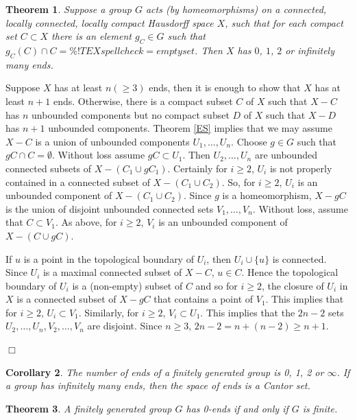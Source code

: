 \documentclass[12pt]{article}
\newtheorem{theorem}{Theorem}[subsection]
\newtheorem{corollary}[theorem]{Corollary}
\newenvironment{proof}{\addvspace{12pt}\noindent{\bf Proof:}}{
$\Box$\par\addvspace{12pt}}
\begin{document}
\begin{theorem}\label{E3inf} 
Suppose a group $G$ acts (by homeomorphisms) on a connected, locally connected, locally compact Hausdorff space $X$, such that for each compact set $C\subset X$ there is an element $g_C\in G$ such that $g_C(C)\cap C=\% !TEX spellcheck = emptyset$. Then $X$ has $0$, $1$, $2$ or infinitely many ends.
\end{theorem}

\begin{proof}
Suppose $X$ has at least $n(\geq 3)$ ends, then it is enough to show that $X$ has at least $n+1$ ends. Otherwise, there is a compact subset $C$ of $X$ such that $X-C$ has $n$ unbounded components but no compact subset $D$ of $X$ such that $X-D$ has $n+1$ unbounded components. Theorem \ref{ES} implies that we may assume $X-C$ is a union of unbounded components $U_1,\ldots, U_n$. Choose $g\in G$ such that $gC\cap C=\emptyset$. Without loss assume $gC\subset U_1$. Then $U_2,\ldots, U_n$ are unbounded connected subsets of $X-(C_1\cup gC_1)$. Certainly for $i\geq 2$, $U_i$ is not properly contained in a connected subset of $X-(C_1\cup C_2)$. So, for $i\geq 2$, $U_i$ is an unbounded component of $X-(C_1\cup C_2)$. Since $g$ is a homeomorphism, $X-gC$ is the union of disjoint unbounded connected sets $V_1,\ldots, V_n$. Without loss, assume that $C\subset V_1$. As above, for $i\geq 2$, $V_i$ is an unbounded component of $X-(C\cup gC)$. 

If $u$ is a point in the topological boundary of $U_i$, then $U_i\cup\{u\}$ is connected. Since $U_i$ is a maximal connected subset of $X-C$, $u\in C$. Hence the topological boundary of $U_i$ is a (non-empty) subset of $C$ and so for $i\geq 2$, the closure of $U_i$ in $X$ is a connected subset of $X-gC$ that contains a point of $V_1$. This implies that for $i\geq 2$, $U_i\subset V_1$. Similarly, for $i\geq 2$, $V_i\subset U_1$. This implies that the $2n-2$ sets $U_2,\ldots, U_n, V_2,\ldots, V_n$ are disjoint. Since $n\geq 3$, $2n-2=n+(n-2)\geq n+1$.
\end{proof}

\begin{corollary}
The number of ends of a finitely generated group is 0, 1, 2 or $\infty$. If a group has infinitely many ends, then the space of ends is a Cantor set.
\end{corollary}





\begin{theorem}
A finitely generated group $G$ has 0-ends if and only if $G$ is finite.
\end{theorem}
 
\end{document}

